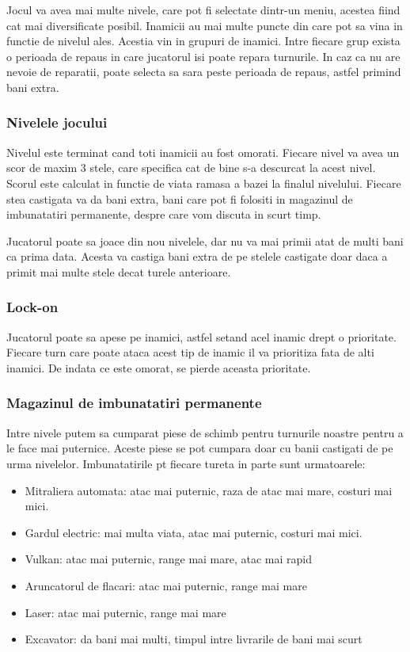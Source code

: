 \documentclass[12pt, a4paper]{article}
\begin{document}
	Jocul va avea mai multe nivele, care pot fi selectate dintr-un meniu, acestea fiind cat mai diversificate posibil. Inamicii au mai multe puncte din care pot sa vina in functie de nivelul ales. Acestia vin in grupuri de inamici. Intre fiecare grup exista o perioada de repaus in care jucatorul isi poate repara turnurile. In caz ca nu are nevoie de reparatii, poate selecta sa sara peste perioada de repaus, astfel primind bani extra.
	
	
	
	\subsubsection{Nivelele jocului}
	
	Nivelul este terminat cand toti inamicii au fost omorati. Fiecare nivel va avea un scor de maxim 3 stele, care specifica cat de bine s-a descurcat la acest nivel. Scorul este calculat in functie de viata ramasa a bazei la finalul nivelului. Fiecare stea castigata va da bani extra, bani care pot fi folositi in magazinul de imbunatatiri permanente, despre care vom discuta in scurt timp.
	
	Jucatorul poate sa joace din nou nivelele, dar nu va mai primii atat de multi bani ca prima data. Acesta va castiga bani extra de pe stelele castigate doar daca a primit mai multe stele decat turele anterioare.
	
	
	
	\subsubsection{Lock-on}
	
	Jucatorul poate sa apese pe inamici, astfel setand acel inamic drept o prioritate. Fiecare turn care poate ataca acest tip de inamic il va prioritiza fata de alti inamici. De indata ce este omorat, se pierde aceasta prioritate.
	
	
	
	\subsubsection{Magazinul de imbunatatiri permanente}
	
	Intre nivele putem sa cumparat piese de schimb pentru turnurile noastre pentru a le face mai puternice. Aceste piese se pot cumpara doar cu banii castigati de pe urma nivelelor. Imbunatatirile pt fiecare tureta in parte sunt urmatoarele:
	
	\begin{itemize}
		\item Mitraliera automata: atac mai puternic, raza de atac mai mare, costuri mai mici.
		\item Gardul electric: mai multa viata, atac mai puternic, costuri mai mici.
		\item Vulkan: atac mai puternic, range mai mare, atac mai rapid
		\item Aruncatorul de flacari: atac mai puternic, range mai mare
		\item Laser: atac mai puternic, range mai mare
		\item Excavator: da bani mai multi, timpul intre livrarile de bani mai scurt
	\end{itemize}
	
\end{document}

